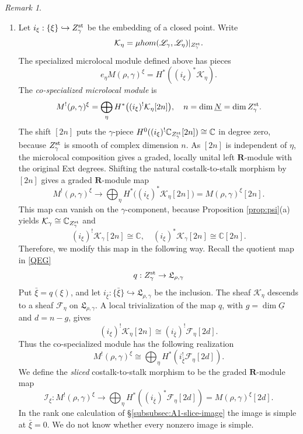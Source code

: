\documentclass[11pt,reqno]{amsart}
\theoremstyle{definition}
\theoremstyle{remark}
\newtheorem{Remark}[Theorem]{Remark}
\def\bbC{\mathbb C}
\def\dN{\underline N}
\def\dG{\underline G}
\def\muhom{\mu hom}
\def\bR{\mathbf R}
\begin{document}
\begin{Remark}
\begin{enumerate}[label=$\mathrm{(\alph*)}$,leftmargin=8mm]
\item
Let $i_\xi:\{\xi\}\hookrightarrow Z_\gamma^{\rm st}$ be the embedding of a closed point.  Write
\begin{align}\label{eq:microlocal-K}\mathcal K_\eta=\muhom(\mathscr L_\gamma,\mathscr L_\eta)|_{Z_\gamma^{\rm st}}.\end{align}
The specialized microlocal module defined above has pieces
$$e_\eta M(\rho,\gamma)^\xi=H^*((i_\xi)^*\mathcal K_\eta).$$
The \emph{co-specialized microlocal module} is
\[
 M^!(\rho,\gamma)^\xi
 =\bigoplus_\eta H^*\bigl((i_\xi)^!\mathcal K_\eta[2n]\bigr),
 \quad n=\dim\dN=\dim Z_\gamma^{\rm st}.
\]
The shift $[2n]$ puts the $\gamma$-piece
$H^0((i_\xi)^!\bbC_{Z_\gamma^{\rm st}}[2n])\cong\bbC$
in degree zero, because $Z_\gamma^{\rm st}$ is smooth of
complex dimension $n$. As $[2n]$ is independent of $\eta$,
the microlocal composition gives a graded, locally unital left
$\bR$-module with the original Ext degrees. Shifting the natural
costalk-to-stalk morphism by $[2n]$ gives a graded $\bR$-module map
\begin{equation}\label{eq:co-specialized-to-specialized}
M^!(\rho,\gamma)^\xi
 \longrightarrow
 \bigoplus_\eta H^*\bigl((i_\xi)^*\mathcal K_\eta[2n]\bigr)
 =M(\rho,\gamma)^\xi[2n].
\end{equation}
This map can vanish on the $\gamma$-component, because Proposition \ref{prop:psi}(a) yields 
$\mathcal K_\gamma\cong\bbC_{Z_\gamma^{\rm st}}$ and
\[
 (i_\xi)^!\mathcal K_\gamma[2n]\cong\bbC,
 \quad (i_\xi)^*\mathcal K_\gamma[2n]\cong\bbC[2n].
\]
Therefore, we modify this map in the following way.
Recall the quotient map in \eqref{QEG}
$$q:Z_\gamma^{\rm st}\to\mathfrak L_{\rho,\gamma}$$ 
Put $\bar\xi=q(\xi)$, and let $i_{\bar\xi}:\{\bar\xi\}\hookrightarrow
\mathfrak L_{\rho,\gamma}$ be the inclusion. 
The sheaf $\mathcal K_\eta$ descends to a sheaf $\mathcal F_\eta$ on $\mathfrak L_{\rho,\gamma}$.
A local trivialization of the map $q$, with
$g=\dim\dG$ and $d=n-g$, gives
\[
 (i_\xi)^!\mathcal K_\eta[2n]
 \cong (i_{\bar\xi})^!\mathcal F_\eta[2d].
\]
Thus the co-specialized module has the following realization
$$M^!(\rho,\gamma)^\xi\cong
\bigoplus_\eta H^*(i_{\bar\xi}^!\mathcal F_\eta[2d]).$$
We define the \emph{sliced} costalk-to-stalk morphism to be the graded $\bR$-module map
\begin{equation}\label{eq:co-specialized-slice-map}
 \mathcal I_\xi:M^!(\rho,\gamma)^\xi
 \longrightarrow
 \bigoplus_\eta H^*((i_{\bar\xi})^*\mathcal F_\eta[2d])
 =M(\rho,\gamma)^\xi[2d].
\end{equation}
 In the rank one calculation of
\S\ref{subsubsec:A1-slice-image} the image is  simple at
$\bar\xi=0$. We do not know whether every nonzero image is simple.
\end{enumerate}
\end{Remark}
\end{document}
